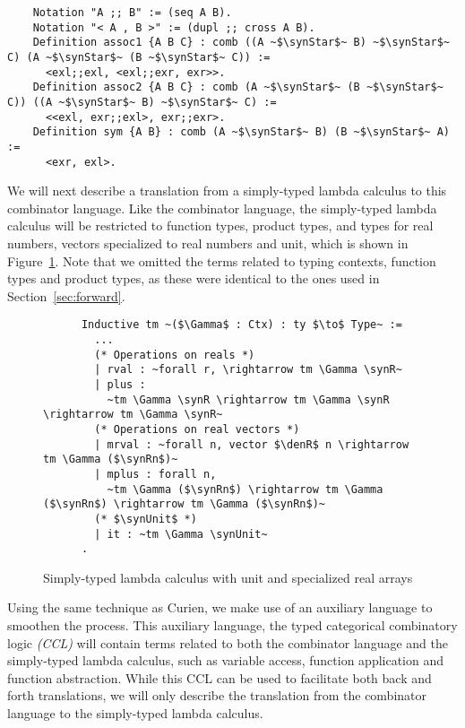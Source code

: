   \begin{verbatim}
    Notation "A ;; B" := (seq A B).
    Notation "< A , B >" := (dupl ;; cross A B).
    Definition assoc1 {A B C} : comb ((A ~$\synStar$~ B) ~$\synStar$~ C) (A ~$\synStar$~ (B ~$\synStar$~ C)) :=
      <exl;;exl, <exl;;exr, exr>>.
    Definition assoc2 {A B C} : comb (A ~$\synStar$~ (B ~$\synStar$~ C)) ((A ~$\synStar$~ B) ~$\synStar$~ C) :=
      <<exl, exr;;exl>, exr;;exr>.
    Definition sym {A B} : comb (A ~$\synStar$~ B) (B ~$\synStar$~ A) :=
      <exr, exl>.
  \end{verbatim}

  We will next describe a translation from a simply-typed lambda calculus to this combinator language.
  Like the combinator language, the simply-typed lambda calculus will be restricted to function types, product types, and types for real numbers, vectors specialized to real numbers and unit, which is shown in Figure~\ref{fig:stlc_combinator}.
  Note that we omitted the terms related to typing contexts, function types and product types, as these were identical to the ones used in Section~\ref{sec:forward}.

  \begin{figure}
    \centering
    \begin{verbatim}
      Inductive tm ~($\Gamma$ : Ctx) : ty $\to$ Type~ :=
        ...
        (* Operations on reals *)
        | rval : ~forall r, \rightarrow tm \Gamma \synR~
        | plus :
          ~tm \Gamma \synR \rightarrow tm \Gamma \synR \rightarrow tm \Gamma \synR~
        (* Operations on real vectors *)
        | mrval : ~forall n, vector $\denR$ n \rightarrow tm \Gamma ($\synRn$)~
        | mplus : forall n,
          ~tm \Gamma ($\synRn$) \rightarrow tm \Gamma ($\synRn$) \rightarrow tm \Gamma ($\synRn$)~
        (* $\synUnit$ *)
        | it : ~tm \Gamma \synUnit~
      .
    \end{verbatim}
    \caption{Simply-typed lambda calculus with unit and specialized real arrays}
    \label{fig:stlc_combinator}
  \end{figure}

  Using the same technique as Curien\cite{10.1007/3-540-15198-2_10}, we make use of an auxiliary language to smoothen the process.
  This auxiliary language, the typed categorical combinatory logic \textit{(CCL)} will contain terms related to both the combinator language and the simply-typed lambda calculus, such as variable access, function application and function abstraction.
  While this CCL can be used to facilitate both back and forth translations, we will only describe the translation from the combinator language to the simply-typed lambda calculus.

